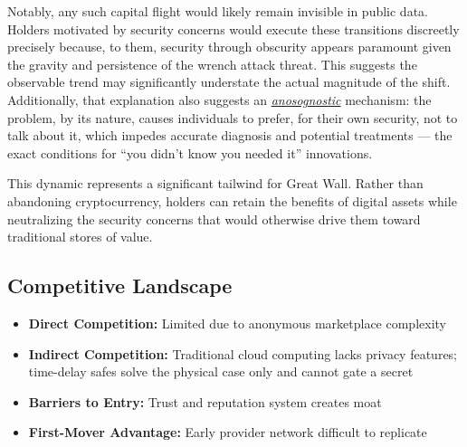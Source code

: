 Notably, any such capital flight would likely remain invisible in public data. Holders motivated by security concerns would execute these transitions discreetly precisely because, to them, security through obscurity appears paramount given the gravity and persistence of the wrench attack threat. This suggests the observable trend may significantly understate the actual magnitude of the shift. Additionally, that explanation also suggests an \href{https://en.wikipedia.org/wiki/Anosognosia}{\textit{anosognostic}} mechanism: the problem, by its nature, causes individuals to prefer, for their own security, not to talk about it, which impedes accurate diagnosis and potential treatments --- the exact conditions for ``you didn't know you needed it'' innovations.

This dynamic represents a significant tailwind for Great Wall. Rather than abandoning cryptocurrency, holders can retain the benefits of digital assets while neutralizing the security concerns that would otherwise drive them toward traditional stores of value.

\subsection{Competitive Landscape}
\begin{itemize}
  \item \textbf{Direct Competition:} Limited due to anonymous marketplace complexity
  \item \textbf{Indirect Competition:} Traditional cloud computing lacks privacy features; time-delay safes solve the physical case only and cannot gate a secret
  \item \textbf{Barriers to Entry:} Trust and reputation system creates moat
  \item \textbf{First-Mover Advantage:} Early provider network difficult to replicate
\end{itemize}
